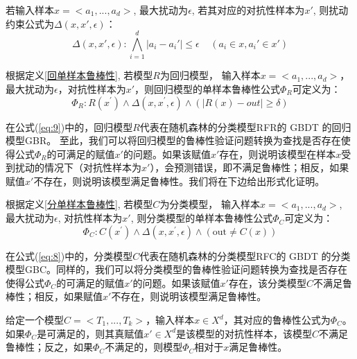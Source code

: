 \begin{define}[特征扰动约束公式]\label{特征扰动约束公式}
若输入样本$x = <a_1,...,a_d>$, 最大扰动为$\epsilon$, 若其对应的对抗性样本为$x'$, 则扰动约束公式为$\Delta(x,x',\epsilon)$：
\begin{equation}\label{eq:7}
\Delta(x, x', \epsilon):\bigwedge_{i=1}^d |a_i-a_i'|\le \epsilon \;\;\;\; (a_i \in x,a_i' \in x')
\end{equation}
\end{define}
\begin{define}[回归模型单样本鲁棒性公式]\label{回归模型单样本鲁棒性公式}
根据定义\ref{回单样本鲁棒性}, 若模型$R$为回归模型， 输入样本$x = <a_1,...,a_d>$，最大扰动为$\epsilon$，对抗性样本为$x'$，则回归模型的单样本鲁棒性公式$\Phi_R$可定义为：
\begin{equation}\label{eq:9}
\Phi_R: R\left(x^{\prime}\right) \wedge \Delta\left(x, x^{\prime}, \epsilon\right) \wedge(|R(x)-out| \ge \delta)
\end{equation}
\end{define}
在公式(\ref{eq:9})中的，回归模型$R$代表在随机森林的分类模型RFR的 GBDT 的回归模型GBR。 至此，我们可以将回归模型的鲁棒性验证问题转换为查找是否存在使得公式$\Phi_R$的可满足的赋值$x'$的问题。如果该赋值$x'$存在，则说明该模型在样本$x$受到扰动的情况下（对抗性样本为$x'$），会预测错误，即不满足鲁棒性；相反，如果赋值$x'$不存在，则说明该模型满足鲁棒性。我们将在下边给出形式化证明。
\begin{define}[分类模型单样本鲁棒性公式]\label{分类模型单样本鲁棒性公式}
根据定义\ref{分单样本鲁棒性}, 若模型$C$为分类模型， 输入样本$x = <a_1,...,a_d>$, 最大扰动为$\epsilon$, 对抗性样本为$x'$, 则分类模型的单样本鲁棒性公式$\Phi_C$可定义为：
\begin{equation}\label{eq:8}
\Phi_C: C\left(x^{\prime}\right) \wedge \Delta\left(x, x^{\prime}, \epsilon\right) \wedge(\text {out} \neq C(x))
\end{equation}
\end{define}
在公式(\ref{eq:8})中的，分类模型$C$代表在随机森林的分类模型RFC的 GBDT 的分类模型GBC。同样的，我们可以将分类模型的鲁棒性验证问题转换为查找是否存在使得公式$\Phi_C$的可满足的赋值$x'$的问题。如果该赋值$x'$存在，该分类模型$C$不满足鲁棒性；相反，如果赋值$x'$不存在，则说明该模型满足鲁棒性。

\begin{theorem}\label{th:7}
给定一个模型$C=<T_1,...,T_k>$，输入样本$x\in X^d$，其对应的鲁棒性公式为$\Phi_C$。 如果$\Phi_C$是可满足的，则其真赋值$x' \in X^d$是该模型的对抗性样本，该模型$C$不满足鲁棒性；反之，如果$\Phi_C$不满足的，则模型$\Phi_C$相对于$x$满足鲁棒性。
\end{theorem}

